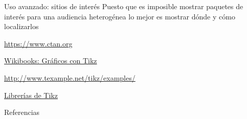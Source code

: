 \documentclass[10pt]{beamer}
\begin{document}
\begin{frame}[fragile]{Uso avanzado: sitios de interés}
Puesto que es imposible mostrar paquetes de interés para una 
audiencia heterogénea lo mejor es mostrar dónde y cómo localizarlos

\href{https://www.ctan.org}{\color{blue}https://www.ctan.org}

\href{https://es.wikibooks.org/wiki/Manual_de_LaTeX/Inclusión_de_gráficos/Gráficos_con_TikZ}{\color{blue}Wikibooks: Gráficos con Tikz}

\href{http://www.texample.net/tikz/examples/}{\color{blue}http://www.texample.net/tikz/examples/}

\href{https://tex.stackexchange.com/questions/42611/list-of-available-tikz-libraries-with-a-short-introduction}{\color{blue} Librerías de Tikz}

\end{frame}


\begin{frame}[allowframebreaks]{Referencias}

%
\end{frame}
\end{document}
